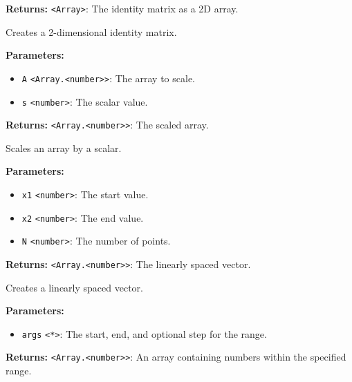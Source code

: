 \documentclass[12pt,a4paper]{article}
\begin{document}
\noindent \textbf{Returns:} \texttt{<Array>}: The identity matrix as a 2D array.

\noindent Creates a 2-dimensional identity matrix.

\vspace{5mm}
\noindent {}


\noindent \textbf{Parameters:}
\begin{itemize}
  \item \texttt{A} \texttt{<Array.<number>>}: The array to scale.
  \item \texttt{s} \texttt{<number>}: The scalar value.
\end{itemize}

\noindent \textbf{Returns:} \texttt{<Array.<number>>}: The scaled array.

\noindent Scales an array by a scalar.

\vspace{5mm}
\noindent {}


\noindent \textbf{Parameters:}
\begin{itemize}
  \item \texttt{x1} \texttt{<number>}: The start value.
  \item \texttt{x2} \texttt{<number>}: The end value.
  \item \texttt{N} \texttt{<number>}: The number of points.
\end{itemize}

\noindent \textbf{Returns:} \texttt{<Array.<number>>}: The linearly spaced vector.

\noindent Creates a linearly spaced vector.

\vspace{5mm}
\noindent {}


\noindent \textbf{Parameters:}
\begin{itemize}
  \item \texttt{args} \texttt{<*>}: The start, end, and optional step for the range.
\end{itemize}

\noindent \textbf{Returns:} \texttt{<Array.<number>>}: An array containing numbers within the specified range.
\end{document}

